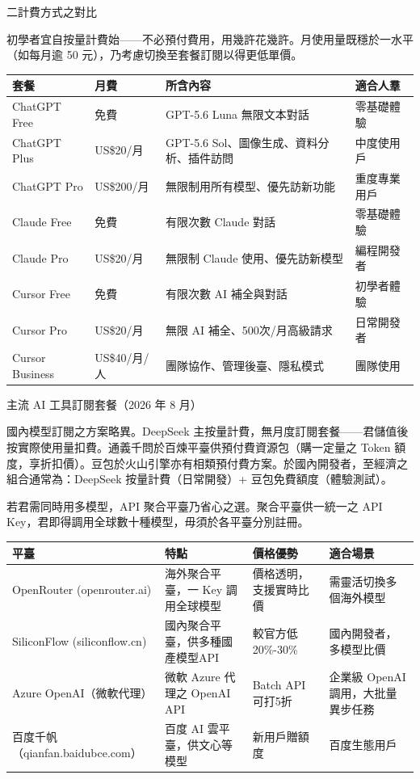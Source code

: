 \begin{center}\small\color{gray}二計費方式之對比\end{center}

初學者宜自按量計費始——不必預付費用，用幾許花幾許。月使用量既穩於一水平（如每月逾 50 元），乃考慮切換至套餐訂閱以得更低單價。


\begin{center}
\begin{tabularx}{\linewidth}{|X|X|X|X|}
\hline
\textbf{套餐} & \textbf{月費} & \textbf{所含內容} & \textbf{適合人羣} \tabularnewline
\hline
ChatGPT Free & 免費 & GPT-5.6 Luna 無限文本對話 & 零基礎體驗 \tabularnewline
ChatGPT Plus & US\$20/月 & GPT-5.6 Sol、圖像生成、資料分析、插件訪問 & 中度使用戶 \tabularnewline
ChatGPT Pro & US\$200/月 & 無限制用所有模型、優先訪新功能 & 重度專業用戶 \tabularnewline
Claude Free & 免費 & 有限次數 Claude 對話 & 零基礎體驗 \tabularnewline
Claude Pro & US\$20/月 & 無限制 Claude 使用、優先訪新模型 & 編程開發者 \tabularnewline
Cursor Free & 免費 & 有限次數 AI 補全與對話 & 初學者體驗 \tabularnewline
Cursor Pro & US\$20/月 & 無限 AI 補全、500次/月高級請求 & 日常開發者 \tabularnewline
Cursor Business & US\$40/月/人 & 團隊協作、管理後臺、隱私模式 & 團隊使用 \tabularnewline
\hline
\end{tabularx}
\end{center}

\begin{center}\small\color{gray}主流 AI 工具訂閱套餐（2026 年 8 月）\end{center}

國內模型訂閱之方案略異。DeepSeek 主按量計費，無月度訂閱套餐——君儲值後按實際使用量扣費。通義千問於百煉平臺供預付費資源包（購一定量之 Token 額度，享折扣價）。豆包於火山引擎亦有相類預付費方案。於國內開發者，至經濟之組合通常為：DeepSeek 按量計費（日常開發）+ 豆包免費額度（體驗測試）。


若君需同時用多模型，API 聚合平臺乃省心之選。聚合平臺供一統一之 API Key，君即得調用全球數十種模型，毋須於各平臺分別註冊。

\begin{center}
\begin{tabularx}{\linewidth}{|X|X|X|X|}
\hline
\textbf{平臺} & \textbf{特點} & \textbf{價格優勢} & \textbf{適合場景} \tabularnewline
\hline
OpenRouter (openrouter.ai) & 海外聚合平臺，一 Key 調用全球模型 & 價格透明，支援實時比價 & 需靈活切換多個海外模型 \tabularnewline
SiliconFlow (siliconflow.cn) & 國內聚合平臺，供多種國產模型API & 較官方低 20\%-30\% & 國內開發者，多模型比價 \tabularnewline
Azure OpenAI（微軟代理） & 微軟 Azure 代理之 OpenAI API & Batch API 可打5折 & 企業級 OpenAI 調用，大批量異步任務 \tabularnewline
百度千帆（qianfan.baidubce.com） & 百度 AI 雲平臺，供文心等模型 & 新用戶贈額度 & 百度生態用戶 \tabularnewline
\hline
\end{tabularx}
\end{center}

